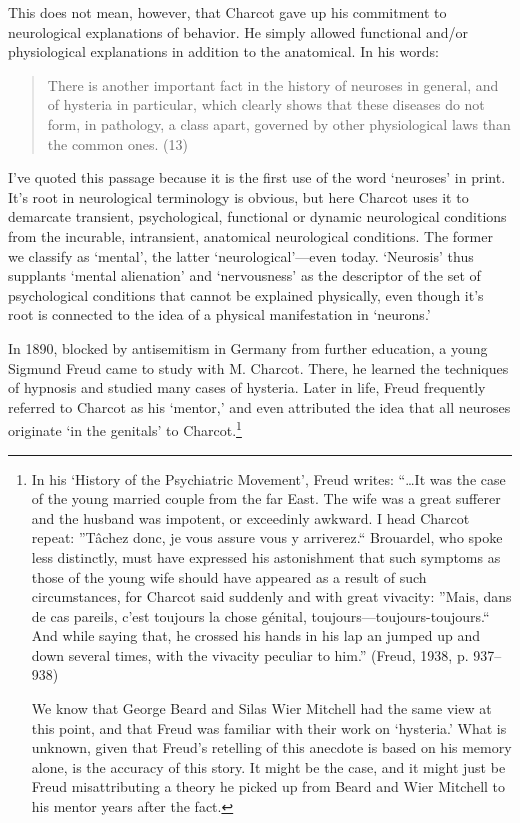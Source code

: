 This does not mean, however, that Charcot gave up his commitment to neurological explanations of behavior. He simply allowed functional and\slash or physiological explanations in addition to the anatomical. In his words:

\begin{quote}

There is another important fact in the history of neuroses in general, and of hysteria in particular, which clearly shows that these diseases do not form, in pathology, a class apart, governed by other physiological laws than the common ones. (13)
\end{quote}

I've quoted this passage because it is the first use of the word `neuroses' in print. It's root in neurological terminology is obvious, but here Charcot uses it to demarcate transient, psychological, functional or dynamic neurological conditions from the incurable, intransient, anatomical neurological conditions. The former we classify as `mental', the latter `neurological'---even today. `Neurosis' thus supplants `mental alienation' and `nervousness' as the descriptor of the set of psychological conditions that cannot be explained physically, even though it's root is connected to the idea of a physical manifestation in `neurons.'

In 1890, blocked by antisemitism in Germany from further education, a young Sigmund Freud came to study with M. Charcot. There, he learned the techniques of hypnosis and studied many cases of hysteria. Later in life, Freud frequently referred to Charcot as his `mentor,' and even attributed the idea that all neuroses originate `in the genitals' to Charcot.\footnote{In his `History of the Psychiatric Movement', Freud writes: ``{\ldots}It was the case of the young married couple from the far East. The wife was a great sufferer and the husband was impotent, or exceedinly awkward. I head Charcot repeat: ''Tâchez donc, je vous assure vous y arriverez.`` Brouardel, who spoke less distinctly, must have expressed his astonishment that such symptoms as those of the young wife should have appeared as a result of such circumstances, for Charcot said suddenly and with great vivacity: ''Mais, dans de cas pareils, c'est toujours la chose génital, toujours---toujours-toujours.`` And while saying that, he crossed his hands in his lap an jumped up and down several times, with the vivacity peculiar to him.'' (Freud, 1938, p. 937--938)

We know that George Beard and Silas Wier Mitchell had the same view at this point, and that Freud was familiar with their work on `hysteria.' What is unknown, given that Freud's retelling of this anecdote is based on his memory alone, is the accuracy of this story. It might be the case, and it might just be Freud misattributing a theory he picked up from Beard and Wier Mitchell to his mentor years after the fact.}

